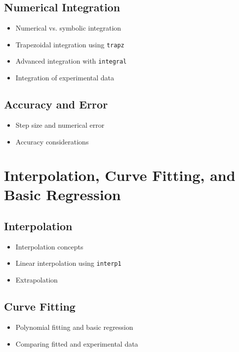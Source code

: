 \documentclass[11pt, a4paper]{article}
\begin{document}
\subsection{Numerical Integration}
\begin{itemize}
  \item Numerical vs. symbolic integration
  \item Trapezoidal integration using \texttt{trapz}
  \item Advanced integration with \texttt{integral}
  \item Integration of experimental data
\end{itemize}

\subsection{Accuracy and Error}
\begin{itemize}
  \item Step size and numerical error
  \item Accuracy considerations
\end{itemize}

\section{Interpolation, Curve Fitting, and Basic Regression}

\subsection{Interpolation}
\begin{itemize}
  \item Interpolation concepts
  \item Linear interpolation using \texttt{interp1}
  \item Extrapolation
\end{itemize}

\subsection{Curve Fitting}
\begin{itemize}
  \item Polynomial fitting and basic regression
  \item Comparing fitted and experimental data
\end{itemize}
\end{document}
